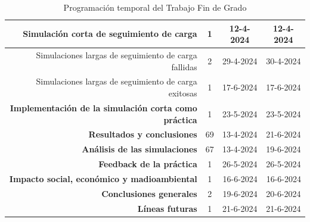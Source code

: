 \begin{table}[!h]
\begin{tabular}{|r|c|c|c|}
    \rowcolor[HTML]{ECF4FF} 
    Simulación corta de seguimiento de carga                     & 1                         & 12-4-2024                         & \cellcolor[HTML]{ECF4FF}12-4-2024 \\ \hline
    \rowcolor[HTML]{ECF4FF} 
    Simulaciones largas de seguimiento de carga fallidas         & 2                         & 29-4-2024                         & 30-4-2024                         \\ \hline
    \rowcolor[HTML]{ECF4FF} 
    Simulaciones largas de seguimiento de carga exitosas &
      1 &
      17-6-2024 &
      \cellcolor[HTML]{ECF4FF}17-6-2024 \\ \hline
    \rowcolor[HTML]{CBE5CB} 
    \textbf{Implementación de la simulación corta como práctica} & 1                         & 23-5-2024                         & 23-5-2024                         \\ \hline
    \rowcolor[HTML]{FFCE93} 
    \textbf{Resultados y conclusiones}                           & 69                        & 13-4-2024                         & 21-6-2024                         \\ \hline
    \rowcolor[HTML]{CBE5CB} 
    \textbf{Análisis de las simulaciones}                        & 67                        & 13-4-2024                         & 19-6-2024                         \\ \hline
    \rowcolor[HTML]{CBE5CB} 
    \textbf{Feedback de la práctica}                             & 1                         & 26-5-2024                         & 26-5-2024                         \\ \hline
    \rowcolor[HTML]{CBE5CB} 
    \textbf{Impacto social, económico y madioambiental} &
      \cellcolor[HTML]{CBE5CB}1 &
      \multicolumn{1}{r|}{\cellcolor[HTML]{CBE5CB}16-6-2024} &
      \multicolumn{1}{r|}{\cellcolor[HTML]{CBE5CB}16-6-2024} \\ \hline
    \rowcolor[HTML]{CBE5CB} 
    \textbf{Conclusiones generales} &
      \cellcolor[HTML]{CBE5CB}2 &
      \multicolumn{1}{r|}{\cellcolor[HTML]{CBE5CB}19-6-2024} &
      \cellcolor[HTML]{CBE5CB}20-6-2024 \\ \hline
    \rowcolor[HTML]{CBE5CB} 
    \textbf{Líneas futuras}                                      & \cellcolor[HTML]{CBE5CB}1 & \cellcolor[HTML]{CBE5CB}21-6-2024 & 21-6-2024                         \\ \hline
    \end{tabular}
    \caption{Programación temporal del Trabajo Fin de Grado}
    \label{tab:progamacion_temporal_tfg}
    \end{table}

